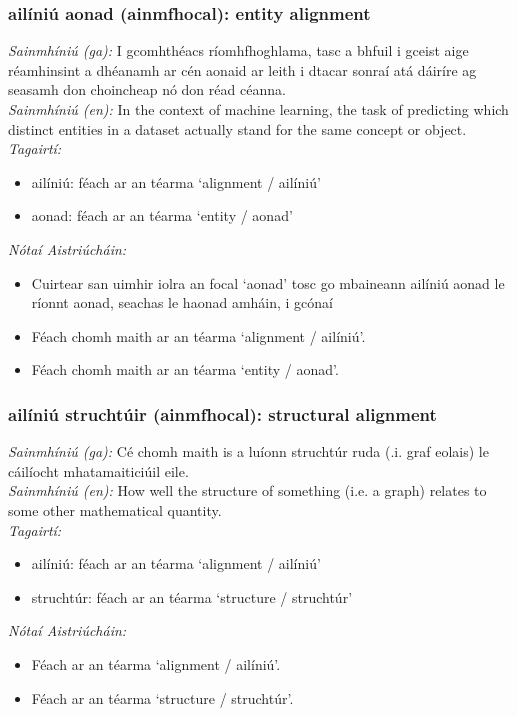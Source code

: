 \documentclass{article}
\begin{document}
\subsubsection*{ailíniú aonad (ainmfhocal): entity alignment}
 \noindent \textit{Sainmhíniú (ga):} I gcomhthéacs ríomhfhoghlama, tasc a bhfuil i gceist aige réamhinsint a dhéanamh ar cén aonaid ar leith i dtacar sonraí atá dáiríre ag seasamh don choincheap nó don réad céanna.
\\
 \noindent \textit{Sainmhíniú (en):} In the context of machine learning, the task of predicting which distinct entities in a dataset actually stand for the same concept or object.
\\
 \noindent \textit{Tagairtí:}
\begin{itemize}
	\item ailíniú: féach ar an téarma `alignment / ailíniú'
	\item aonad: féach ar an téarma `entity / aonad'
\end{itemize}

 \noindent \textit{Nótaí Aistriúcháin:}
\begin{itemize}
	\item Cuirtear san uimhir iolra an focal `aonad' tosc go mbaineann ailíniú aonad le ríonnt aonad, seachas le haonad amháin, i gcónaí
	\item Féach chomh maith ar an téarma `alignment / ailíniú'.
	\item Féach chomh maith ar an téarma `entity / aonad'.
\end{itemize}


\subsubsection*{ailíniú struchtúir (ainmfhocal): structural alignment}
 \noindent \textit{Sainmhíniú (ga):} Cé chomh maith is a luíonn struchtúr ruda (.i. graf eolais) le cáilíocht mhatamaiticiúil eile.
\\
 \noindent \textit{Sainmhíniú (en):} How well the structure of something (i.e. a graph) relates to some other mathematical quantity.
\\
 \noindent \textit{Tagairtí:}
\begin{itemize}
	\item ailíniú: féach ar an téarma `alignment / ailíniú'
	\item struchtúr: féach ar an téarma `structure / struchtúr'
\end{itemize}

 \noindent \textit{Nótaí Aistriúcháin:}
\begin{itemize}
	\item Féach ar an téarma `alignment / ailíniú'.
	\item Féach ar an téarma `structure / struchtúr'.
\end{itemize}
\end{document}
